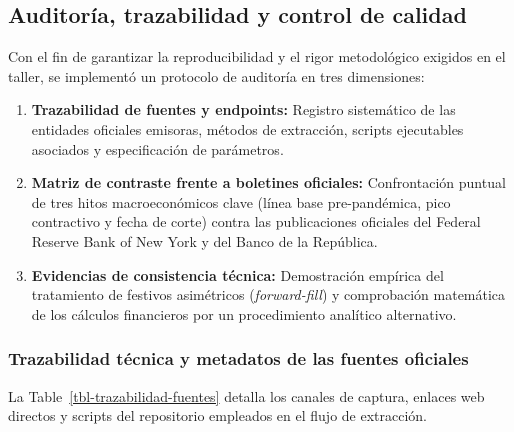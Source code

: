 \documentclass[
  10pt,
  letterpaper,
  DIV=11,
  numbers=noendperiod]{scrartcl}
\providecommand{\tightlist}{%
  \setlength{\itemsep}{0pt}\setlength{\parskip}{0pt}}
\begin{document}
\subsection{Auditoría, trazabilidad y control de
calidad}\label{auditoruxeda-trazabilidad-y-control-de-calidad}

Con el fin de garantizar la reproducibilidad y el rigor metodológico
exigidos en el taller, se implementó un protocolo de auditoría en tres
dimensiones:

\begin{enumerate}
\def\labelenumi{\arabic{enumi}.}
\tightlist
\item
  \textbf{Trazabilidad de fuentes y endpoints:} Registro sistemático de
  las entidades oficiales emisoras, métodos de extracción, scripts
  ejecutables asociados y especificación de parámetros.
\item
  \textbf{Matriz de contraste frente a boletines oficiales:}
  Confrontación puntual de tres hitos macroeconómicos clave (línea base
  pre-pandémica, pico contractivo y fecha de corte) contra las
  publicaciones oficiales del Federal Reserve Bank of New York y del
  Banco de la República.
\item
  \textbf{Evidencias de consistencia técnica:} Demostración empírica del
  tratamiento de festivos asimétricos (\emph{forward-fill}) y
  comprobación matemática de los cálculos financieros por un
  procedimiento analítico alternativo.
\end{enumerate}

\subsubsection{Trazabilidad técnica y metadatos de las fuentes
oficiales}\label{trazabilidad-tuxe9cnica-y-metadatos-de-las-fuentes-oficiales}

La Table~\ref{tbl-trazabilidad-fuentes} detalla los canales de captura,
enlaces web directos y scripts del repositorio empleados en el flujo de
extracción.
\end{document}
